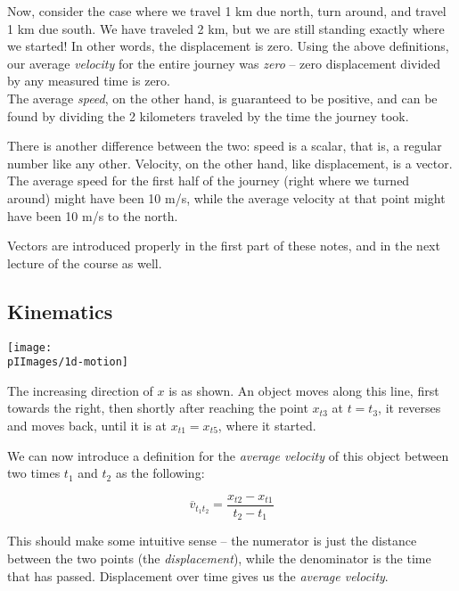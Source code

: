 Now, consider the case where we travel 1 km due north, turn around, and travel 1 km due south. We have traveled 2 km, but we are still standing exactly where we started! In other words, the displacement is zero. Using the above definitions, our average \emph{velocity} for the entire journey was \emph{zero} -- zero displacement divided by any measured time is zero.\\
The average \emph{speed}, on the other hand, is guaranteed to be positive, and can be found by dividing the 2 kilometers traveled by the time the journey took.

There is another difference between the two: speed is a scalar, that is, a regular number like any other. Velocity, on the other hand, like displacement, is a vector.\\
The average speed for the first half of the journey (right where we turned around) might have been 10 m/s, while the average velocity at that point might have been 10 m/s to the north.

Vectors are introduced properly in the first part of these notes, and in the next lecture of the course as well.

\subsection{Kinematics}

\begin{center}
\texttt{[image: \\pIImages/1d-motion]}
\end{center}

The increasing direction of $x$ is as shown. An object moves along this line, first towards the right, then shortly after reaching the point $x_{t3}$ at  $t = t_3$, it reverses and moves back, until it is at $x_{t1} = x_{t5}$, where it started.

We can now introduce a definition for the \emph{average velocity} of this object between two times $t_1$ and $t_2$ as the following:

\begingroup
\large
\begin{equation}
 \overbar{v}_{t_1 t_2} = \frac{x_{t2} - x_{t1}}{t_2 - t_1}
\end{equation}
\endgroup

This should make some intuitive sense -- the numerator is just the distance between the two points (the \emph{displacement}), while the denominator is the time that has passed. Displacement over time gives us the \emph{average velocity}.

